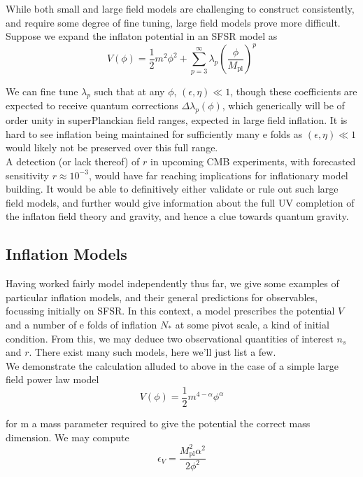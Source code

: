 \documentclass[a4paper,10pt]{article}
\newcommand{\Mp}{M_{\text{pl}}}
\newcommand{\half}{\frac{1}{2}}
\begin{document}
While both small and large field models are challenging to construct consistently, and require some degree of fine tuning, large field models prove more difficult. Suppose we expand the inflaton potential in an SFSR model as 
\begin{equation}
V(\phi) = \half m^2\phi^2 + \sum_{p=3}^\infty \lambda_p\left(\frac{\phi}{\Mp}\right)^p
\end{equation}

We can fine tune $\lambda_p$ such that at any $\phi$, $(\epsilon, \eta) \ll 1$, though these coefficients are expected to receive quantum corrections $\Delta\lambda_p(\phi)$, which generically will be of order unity in superPlanckian field ranges, expected in large field inflation. It is hard to see inflation being maintained for sufficiently many e folds as $(\epsilon, \eta) \ll 1$ would likely not be preserved over this full range. \\

A detection (or lack thereof) of $r$ in upcoming CMB experiments, with forecasted sensitivity $r\approx 10^{-3}$, would have far reaching implications for inflationary model building. It would be able to definitively either validate or rule out such large field models, and further would give information about the full UV completion of the inflaton field theory and gravity, and hence a clue towards quantum gravity.

\subsection{Inflation Models}

Having worked fairly model independently thus far, we give some examples of particular inflation models, and their general predictions for observables, focussing initially on SFSR. In this context, a model prescribes the potential $V$ and a number of e folds of inflation $N_*$ at some pivot scale, a kind of initial condition. From this, we may deduce two observational quantities of interest $n_s$ and $r$. There exist many such models, here we'll just list a few. \\

We demonstrate the calculation alluded to above in the case of a simple large field power law model \cite{QBM}
\begin{equation}
V(\phi) = \half m^{4-\alpha}\phi^\alpha
\end{equation}

for m a mass parameter required to give the potential the correct mass dimension. We may compute 
\begin{equation}
\epsilon_V = \frac{\Mp^2\alpha^2}{2\phi^2}
\end{equation}
	
\end{document}
